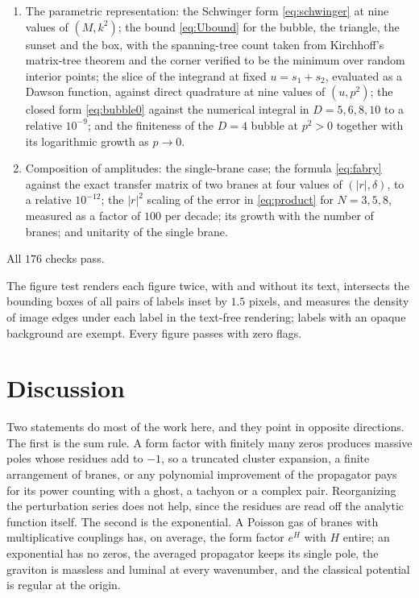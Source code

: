\documentclass[aps,prd,10pt,twocolumn,superscriptaddress,nofootinbib,floatfix,longbibliography,showpacs,showkeys]{revtex4-2}
\theoremstyle{plain}
\theoremstyle{definition}
\theoremstyle{remark}
\begin{document}
\begin{enumerate}[label=\textup{(\arabic*)},leftmargin=2.4em,itemsep=0.1em]
\item The parametric representation: the Schwinger form \eqref{eq:schwinger} at nine values of $(M,k^2)$; the bound \eqref{eq:Ubound} for the bubble, the triangle, the sunset and the box, with the spanning-tree count taken from Kirchhoff's matrix-tree theorem and the corner verified to be the minimum over random interior points; the slice of the integrand at fixed $u=s_1+s_2$, evaluated as a Dawson function, against direct quadrature at nine values of $(u,p^2)$; the closed form \eqref{eq:bubble0} against the numerical integral in $D=5,6,8,10$ to a relative $10^{-9}$; and the finiteness of the $D=4$ bubble at $p^2>0$ together with its logarithmic growth as $p\to0$.
\item Composition of amplitudes: the single-brane case; the formula \eqref{eq:fabry} against the exact transfer matrix of two branes at four values of $(|r|,\delta)$, to a relative $10^{-12}$; the $|r|^2$ scaling of the error in \eqref{eq:product} for $N=3,5,8$, measured as a factor of $100$ per decade; its growth with the number of branes; and unitarity of the single brane.
\end{enumerate}
All $176$ checks pass.

The figure test renders each figure twice, with and without its text, intersects the bounding boxes of all pairs of labels inset by $1.5$ pixels, and measures the density of image edges under each label in the text-free rendering; labels with an opaque background are exempt. Every figure passes with zero flags.

\section{Discussion}
\label{sec:discussion}

Two statements do most of the work here, and they point in opposite directions. The first is the sum rule. A form factor with finitely many zeros produces massive poles whose residues add to $-1$, so a truncated cluster expansion, a finite arrangement of branes, or any polynomial improvement of the propagator pays for its power counting with a ghost, a tachyon or a complex pair. Reorganizing the perturbation series does not help, since the residues are read off the analytic function itself. The second is the exponential. A Poisson gas of branes with multiplicative couplings has, on average, the form factor $e^{H}$ with $H$ entire; an exponential has no zeros, the averaged propagator keeps its single pole, the graviton is massless and luminal at every wavenumber, and the classical potential is regular at the origin.
\end{document}
